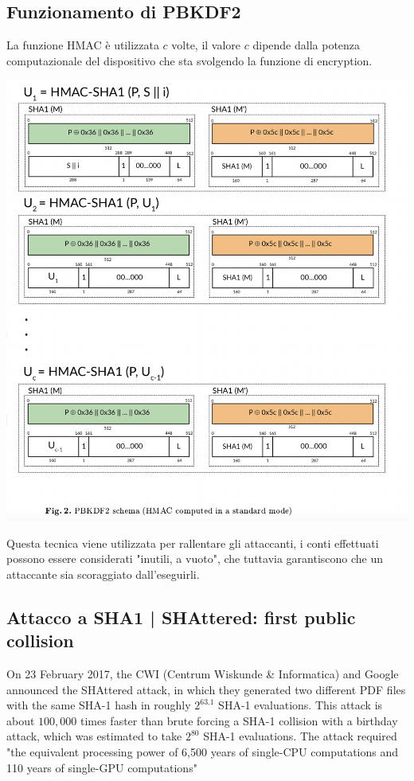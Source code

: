 \documentclass[11pt, oneside]{article}   	%
\begin{document}
\subsection*{Funzionamento di PBKDF2}
La funzione HMAC è utilizzata $c$ volte, il valore $c$ dipende dalla potenza computazionale del dispositivo che sta svolgendo la funzione di encryption.
\begin{center}
\includegraphics[scale= 0.5]{pbk}
\end{center}
Questa tecnica viene utilizzata per rallentare gli attaccanti, i conti effettuati possono essere considerati "inutili, a vuoto", che tuttavia garantiscono che un attaccante sia scoraggiato dall'eseguirli.


\subsection*{Attacco a SHA1 | SHAttered: first public collision}
On 23 February 2017, the CWI (Centrum Wiskunde \& Informatica) and Google announced the SHAttered attack, in which they generated two different PDF files with the same SHA-1 hash in roughly $2^{63.1}$ SHA-1 evaluations. This attack is about $100,000$ times faster than brute forcing a SHA-1 collision with a birthday attack, which was estimated to take $2^{80}$ SHA-1 evaluations. The attack required "the equivalent processing power of 6,500 years of single-CPU computations and 110 years of single-GPU computations"
\end{document}
